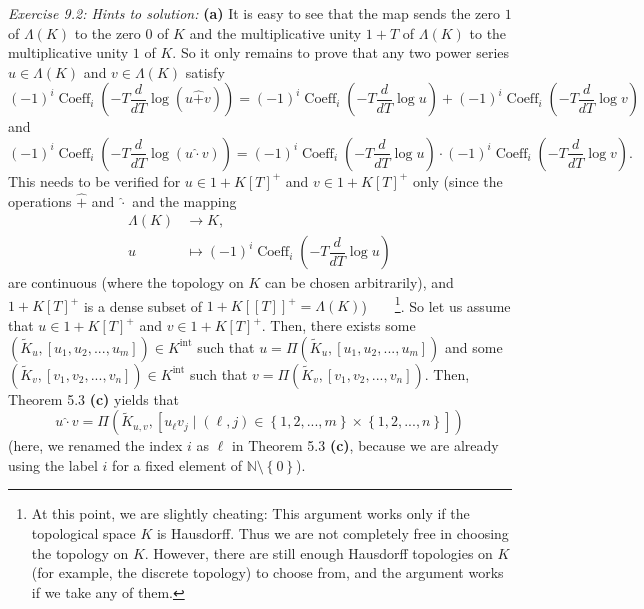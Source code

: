 \documentclass[numbers=enddot,12pt,final,onecolumn,notitlepage]{scrartcl}%
\begin{document}
\textit{Exercise 9.2: Hints to solution:} \textbf{(a)} It is easy to see that
the map sends the zero $1$ of $\Lambda\left(  K\right)  $ to the zero $0$ of
$K$ and the multiplicative unity $1+T$ of $\Lambda\left(  K\right)  $ to the
multiplicative unity $1$ of $K$. So it only remains to prove that any two
power series $u\in\Lambda\left(  K\right)  $ and $v\in\Lambda\left(  K\right)
$ satisfy%
\begin{equation}
\left(  -1\right)  ^{i}\operatorname*{Coeff}\nolimits_{i}\left(  -T\dfrac
{d}{dT}\log\left(  u\widehat{+}v\right)  \right)  =\left(  -1\right)
^{i}\operatorname*{Coeff}\nolimits_{i}\left(  -T\dfrac{d}{dT}\log u\right)
+\left(  -1\right)  ^{i}\operatorname*{Coeff}\nolimits_{i}\left(  -T\dfrac
{d}{dT}\log v\right)  \label{9.2.plus}%
\end{equation}
and%
\begin{equation}
\left(  -1\right)  ^{i}\operatorname*{Coeff}\nolimits_{i}\left(  -T\dfrac
{d}{dT}\log\left(  u\widehat{\cdot}v\right)  \right)  =\left(  -1\right)
^{i}\operatorname*{Coeff}\nolimits_{i}\left(  -T\dfrac{d}{dT}\log u\right)
\cdot\left(  -1\right)  ^{i}\operatorname*{Coeff}\nolimits_{i}\left(
-T\dfrac{d}{dT}\log v\right)  . \label{9.2.times}%
\end{equation}
This needs to be verified for $u\in1+K\left[  T\right]  ^{+}$ and
$v\in1+K\left[  T\right]  ^{+}$ only (since the operations $\widehat{+}$ and
$\widehat{\cdot}$ and the mapping%
\begin{align*}
\Lambda\left(  K\right)   &  \rightarrow K,\\
u  &  \mapsto\left(  -1\right)  ^{i}\operatorname*{Coeff}\nolimits_{i}\left(
-T\dfrac{d}{dT}\log u\right)
\end{align*}
are continuous (where the topology on $K$ can be chosen arbitrarily), and
$1+K\left[  T\right]  ^{+}$ is a dense subset of $1+K\left[  \left[  T\right]
\right]  ^{+}=\Lambda\left(  K\right)  $)\ \ \ \ \footnote{At this point, we
are slightly cheating: This argument works only if the topological space $K$
is Hausdorff. Thus we are not completely free in choosing the topology on $K$.
However, there are still enough Hausdorff topologies on $K$ (for example, the
discrete topology) to choose from, and the argument works if we take any of
them.}. So let us assume that $u\in1+K\left[  T\right]  ^{+}$ and
$v\in1+K\left[  T\right]  ^{+}$. Then, there exists some $\left(
\widetilde{K}_{u},\left[  u_{1},u_{2},...,u_{m}\right]  \right)  \in
K^{\operatorname*{int}}$ such that $u=\Pi\left(  \widetilde{K}_{u},\left[
u_{1},u_{2},...,u_{m}\right]  \right)  $ and some $\left(  \widetilde{K}%
_{v},\left[  v_{1},v_{2},...,v_{n}\right]  \right)  \in K^{\operatorname*{int}%
}$ such that $v=\Pi\left(  \widetilde{K}_{v},\left[  v_{1},v_{2}%
,...,v_{n}\right]  \right)  $. Then, Theorem 5.3 \textbf{(c)} yields that%
\[
u\widehat{\cdot}v=\Pi\left(  \widetilde{K}_{u,v},\left[  u_{\ell}v_{j}%
\mid\left(  \ell,j\right)  \in\left\{  1,2,...,m\right\}  \times\left\{
1,2,...,n\right\}  \right]  \right)
\]
(here, we renamed the index $i$ as $\ell$ in Theorem 5.3 \textbf{(c)}, because
we are already using the label $i$ for a fixed element of $\mathbb{N}%
\setminus\left\{  0\right\}  $).
\end{document}
